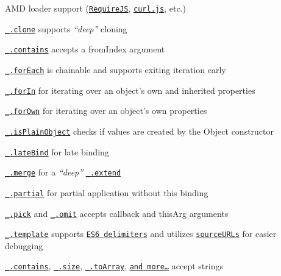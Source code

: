 \begin{DoxyItemize}
\item A\+M\+D loader support (\href{http://requirejs.org/}{\tt Require\+J\+S}, \href{https://github.com/cujojs/curl}{\tt curl.\+js}, etc.)
\item \href{http://lodash.com/docs#clone}{\tt \+\_\+.\+clone} supports {\itshape “deep”} cloning
\item \href{http://lodash.com/docs#contains}{\tt \+\_\+.\+contains} accepts a {\ttfamily from\+Index} argument
\item \href{http://lodash.com/docs#forEach}{\tt \+\_\+.\+for\+Each} is chainable and supports exiting iteration early
\item \href{http://lodash.com/docs#forIn}{\tt \+\_\+.\+for\+In} for iterating over an object’s own and inherited properties
\item \href{http://lodash.com/docs#forOwn}{\tt \+\_\+.\+for\+Own} for iterating over an object’s own properties
\item \href{http://lodash.com/docs#isPlainObject}{\tt \+\_\+.\+is\+Plain\+Object} checks if values are created by the {\ttfamily Object} constructor
\item \href{http://lodash.com/docs#lateBind}{\tt \+\_\+.\+late\+Bind} for late binding
\item \href{http://lodash.com/docs#merge}{\tt \+\_\+.\+merge} for a {\itshape “deep”} \href{http://lodash.com/docs#extend}{\tt \+\_\+.\+extend}
\item \href{http://lodash.com/docs#partial}{\tt \+\_\+.\+partial} for partial application without {\ttfamily this} binding
\item \href{http://lodash.com/docs#pick}{\tt \+\_\+.\+pick} and \href{http://lodash.com/docs#omit}{\tt \+\_\+.\+omit} accepts {\ttfamily callback} and {\ttfamily this\+Arg} arguments
\item \href{http://lodash.com/docs#template}{\tt \+\_\+.\+template} supports \href{http://people.mozilla.org/~jorendorff/es6-draft.html#sec-7.8.6}{\tt E\+S6 delimiters} and utilizes \href{http://www.html5rocks.com/en/tutorials/developertools/sourcemaps/#toc-sourceurl}{\tt source\+U\+R\+Ls} for easier debugging
\item \href{http://lodash.com/docs#contains}{\tt \+\_\+.\+contains}, \href{http://lodash.com/docs#size}{\tt \+\_\+.\+size}, \href{http://lodash.com/docs#toArray}{\tt \+\_\+.\+to\+Array}, \href{http://lodash.com/docs}{\tt and more…} accept strings
\end{DoxyItemize}

